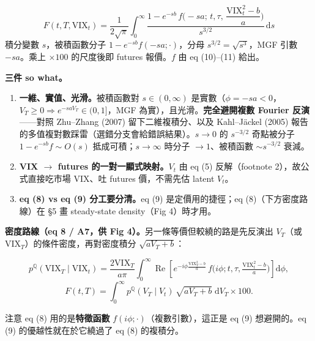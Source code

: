 \documentclass[12pt, a4paper]{article}
\theoremstyle{remark}
\newcommand{\Q}{\mathbb{Q}}
\newcommand{\dd}{\mathrm{d}}
\newcommand{\VIX}{\mathrm{VIX}}
\newcommand{\Real}{\operatorname{Re}}
\begin{document}
\begin{keybox}[title={eq (9) = eq (A10)：論文的標題成果}]
\begin{equation}
  \boxed{\ F(t,T,\VIX_t) = \frac{1}{2\sqrt\pi}\int_0^\infty
  \frac{1 - e^{-sb}\,f\!\Big(-sa;\,t,\tau,\,\dfrac{\VIX_t^2-b}{a}\Big)}{s^{3/2}}\,\dd s\ }
  \tag{9 / A10}
\end{equation}
積分變數 $s$，被積函數分子 $1-e^{-sb}f(-sa;\cdot)$，分母 $s^{3/2}=\sqrt{s^3}$，MGF 引數 $-sa$。乘上 $\times100$ 的尺度後即 futures 報價。$f$ 由 eq (10)--(11) 給出。
\end{keybox}

\textbf{三件 so what。}
\begin{enumerate}[topsep=2pt, itemsep=2pt]
  \item \textbf{一維、實值、光滑。}被積函數對 $s\in(0,\infty)$ 是實數（$\phi=-sa<0$，$V_T\ge0\Rightarrow e^{-saV_T}\in(0,1]$，MGF 為實），且光滑。\textbf{完全避開複數 Fourier 反演}——對照 Zhu--Zhang (2007) 留下二維複積分、以及 Kahl--Jäckel (2005) 報告的多值複對數踩雷（選錯分支會給錯誤結果）。$s\to0$ 的 $s^{-3/2}$ 奇點被分子 $1-e^{-sb}f\sim O(s)$ 抵成可積；$s\to\infty$ 時分子 $\to1$、被積函數 $\sim s^{-3/2}$ 衰減。
  \item \textbf{VIX $\to$ futures 的一對一顯式映射。}$V_t$ 由 eq (5) 反解（footnote 2），故公式直接吃市場 VIX、吐 futures 價，不需先估 latent $V_t$。
  \item \textbf{eq (8) vs eq (9) 分工要分清。}eq (9) 是定價用的捷徑；eq (8)（下方密度路線）在 §5 畫 steady-state density（Fig 4）時才用。
\end{enumerate}

\textbf{密度路線（eq 8 / A7，供 Fig 4）。}另一條等價但較繞的路是先反演出 $V_T$（或 $\VIX_T$）的條件密度，再對密度積分 $\sqrt{aV_T+b}$：

\begin{equation}
  p^\Q(\VIX_T\mid\VIX_t) = \frac{2\VIX_T}{a\pi}\int_0^\infty
  \Real\!\left[e^{-i\phi\frac{\VIX_T^2-b}{a}}\,f\!\Big(i\phi;t,\tau,\tfrac{\VIX_t^2-b}{a}\Big)\right]\dd\phi,
  \tag{8}
\end{equation}
\begin{equation}
  F(t,T) = \int_0^\infty p^\Q(V_T\mid V_t)\,\sqrt{aV_T+b}\;\dd V_T\times100.
  \tag{A8}
\end{equation}

注意 eq (8) 用的是\textbf{特徵函數} $f(i\phi;\cdot)$（複數引數），這正是 eq (9) 想避開的。eq (9) 的優越性就在於它繞過了 eq (8) 的複積分。

\newpage
\end{document}
